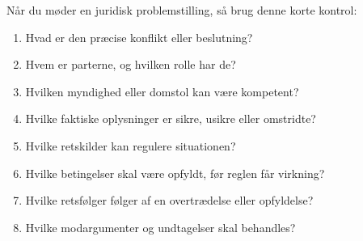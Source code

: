 \documentclass[12pt,oneside,openany]{memoir}
\begin{document}
Når du møder en juridisk problemstilling, så brug denne korte kontrol:
\begin{enumerate}
  \item Hvad er den præcise konflikt eller beslutning?
  \item Hvem er parterne, og hvilken rolle har de?
  \item Hvilken myndighed eller domstol kan være kompetent?
  \item Hvilke faktiske oplysninger er sikre, usikre eller omstridte?
  \item Hvilke retskilder kan regulere situationen?
  \item Hvilke betingelser skal være opfyldt, før reglen får virkning?
  \item Hvilke retsfølger følger af en overtrædelse eller opfyldelse?
  \item Hvilke modargumenter og undtagelser skal behandles?
\end{enumerate}

\tableofcontents*

\mainmatter














\appendix




\backmatter
\renewcommand{\bibname}{Litteratur og retskilder}


\end{document}
